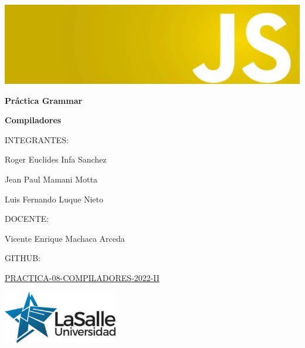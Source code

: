 \pagecolor{white}\afterpage{\nopagecolor}


\includegraphics[width=20cm]{images/for.png}
\vspace{0.25in}

\begin{singlespace}
\fontsize{60}{65}\selectfont \textcolor{FSBlue}{\textbf{Práctica Grammar}}

\vspace{10mm}
\LARGE\textcolor{FSBlue}{\textbf{Compiladores}}

\vspace{0.5in}

\Large\textcolor{FSBlue}{INTEGRANTES:}

\Large\textcolor{FSBlue}{Roger Euclides Infa Sanchez}

\Large\textcolor{FSBlue}{Jean Paul Mamani Motta}

\Large\textcolor{FSBlue}{Luis Fernando Luque Nieto}

\vspace{0.2in}

\Large\textcolor{FSBlue}{DOCENTE:}

\Large\textcolor{FSBlue}{Vicente Enrique Machaca Arceda}

\vspace{0.2in}

\Large\textcolor{FSBlue}{GITHUB:}

\Large\textcolor{FSBlue}{\href{https://github.com/rinfasulasalle/Compiladores-P08-GRAMMAR}{PRACTICA-08-COMPILADORES-2022-II}}

\includegraphics[width=5cm, right]{images/fslogo.png}
\end{singlespace}

\thispagestyle{empty}
\restoregeometry   

